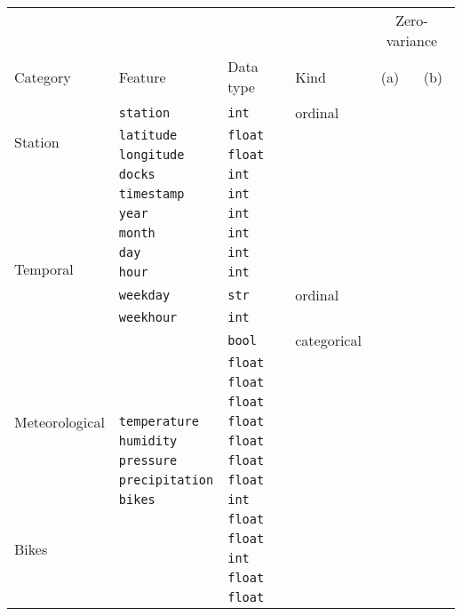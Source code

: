 \newcommand{\tablefeaturesrow}[6]{#1 & #2 & #3 & #4 & #5 & #6 \\}
\begin{tabular}{llllcc}
  \toprule
   &  &  &  & \multicolumn{2}{c}{Zero-variance}
  \\
  \tablefeaturesrow{Category}{Feature}{Data type}{Kind}{(a)}{(b)}
  \midrule
  \tablefeaturesrow{\multirow{4}{*}{Station}}{\texttt{station}}{\texttt{int}}{ordinal}{\checkmark}{}
  \tablefeaturesrow{}{\texttt{latitude}}{\texttt{float}}{}{\checkmark}{}
  \tablefeaturesrow{}{\texttt{longitude}}{\texttt{float}}{}{\checkmark}{}
  \tablefeaturesrow{}{\texttt{docks}}{\texttt{int}}{}{\checkmark}{}
  \midrule
  \tablefeaturesrow{\multirow{8}{*}{Temporal}}{\texttt{timestamp}}{\texttt{int}}{}{}{}
  \tablefeaturesrow{}{\texttt{year}}{\texttt{int}}{}{\checkmark}{\checkmark}
  \tablefeaturesrow{}{\texttt{month}}{\texttt{int}}{}{\checkmark}{\checkmark}
  \tablefeaturesrow{}{\texttt{day}}{\texttt{int}}{}{}{}
  \tablefeaturesrow{}{\texttt{hour}}{\texttt{int}}{}{}{}
  \tablefeaturesrow{}{\texttt{weekday}}{\texttt{str}}{ordinal}{}{}
  \tablefeaturesrow{}{\texttt{weekhour}}{\texttt{int}}{}{}{}
  \tablefeaturesrow{}{\texttt{\isholiday}}{\texttt{bool}}{categorical}{}{}
  \midrule
  \tablefeaturesrow{\multirow{7}{*}{Meteorological}}{\texttt{\windspeedmax}}{\texttt{float}}{}{}{}
  \tablefeaturesrow{}{\texttt{\windspeedavg}}{\texttt{float}}{}{}{}
  \tablefeaturesrow{}{\texttt{\winddirection}}{\texttt{float}}{}{}{}
  \tablefeaturesrow{}{\texttt{temperature}}{\texttt{float}}{}{}{}
  \tablefeaturesrow{}{\texttt{humidity}}{\texttt{float}}{}{}{}
  \tablefeaturesrow{}{\texttt{pressure}}{\texttt{float}}{}{}{}
  \tablefeaturesrow{}{\texttt{precipitation}}{\texttt{float}}{}{\checkmark}{\checkmark}
  \midrule
  \tablefeaturesrow{\multirow{6}{*}{Bikes}}{\texttt{bikes}}{\texttt{int}}{}{}{}
  \tablefeaturesrow{}{\texttt{\bikesavgfull}}{\texttt{float}}{}{}{}
  \tablefeaturesrow{}{\texttt{\bikesavgshort}}{\texttt{float}}{}{}{}
  \tablefeaturesrow{}{\texttt{\bikesh}}{\texttt{int}}{}{}{}
  \tablefeaturesrow{}{\texttt{\bikeshdiffavgfull}}{\texttt{float}}{}{}{}
  \tablefeaturesrow{}{\texttt{\bikeshdiffavgshort}}{\texttt{float}}{}{}{}
  \bottomrule
\end{tabular}
